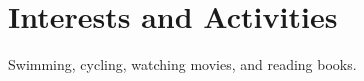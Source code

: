 \documentclass[a4paper, 11pt]{article}
\begin{document}
	\section{Interests and Activities}
	Swimming, cycling, watching movies, and reading books.
	
\end{document}
